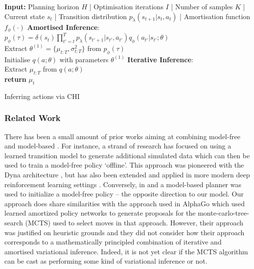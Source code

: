 \begin{algorithm}[H]
  \label{algo:chi}
  \SetAlgoLined
     \DontPrintSemicolon
     \textbf{Input:} Planning horizon $H$ | Optimisation iterations $I$ | Number of samples $K$ | Current state $s_t$ |  Transition distribution $p_{\lambda}(s_{t+1}|s_t, a_t)$ | Amortisation function $f_{\phi}(\cdot)$
     \BlankLine
     \textbf{Amortised Inference}: \\
    $p_{\phi}(\tau) = \delta(s_t) \prod_{t'=t}^T p_{\lambda}(s_{t'+1}|s_{t'}, a_{t'}) q_{\phi}(a_{t'}|s_{t'}; \theta)$ \\
     Extract $\theta^{(1)} = \{\mu_{t:T}, \sigma_{t:T}^2 \}$ from $p_{\phi}(\tau) $ \\
     Initialise $q(a; \theta)$ with parameters $\theta^{(1)}$
     \BlankLine
     \textbf{Iterative Inference}: \\
  \BlankLine
  Extract $\mu_{t:T}$ from $q(a; \theta)$ \\
  \textbf{return} $\mu_t$
  \caption{Inferring actions via CHI}
\end{algorithm}


\subsubsection{Related Work}

There has been a small amount of prior works aiming at combining model-free and model-based 
\citep{li2020robot,che2018combining}. For instance, a strand of research has focused on using a learned transition model to generate additional simulated data which can then be used to train a model-free policy `offline'. This approach was pioneered with the Dyna architecture \citep{sutton1991dyna}, but has also been extended and applied in more modern deep reinforcement learning settings \citep{gu2016continuous}. Conversely, in \citep{farshidian2014learning} and \citep{nagabandi2018neural} a model-based planner was used to initialize a model-free policy -- the opposite direction to our model. Our approach does share similarities with the approach used in AlphaGo \citep{silver2017mastering} which used learned amortized policy networks to generate proposals for the monte-carlo-tree-search (MCTS) used to select moves in that approach. However, their approach was justified on heuristic grounds and they did not consider how their approach corresponds to a mathematically principled combination of iterative and amortised variational inference. Indeed, it is not yet clear if the MCTS algorithm can be cast as performing some kind of variational inference or not.

